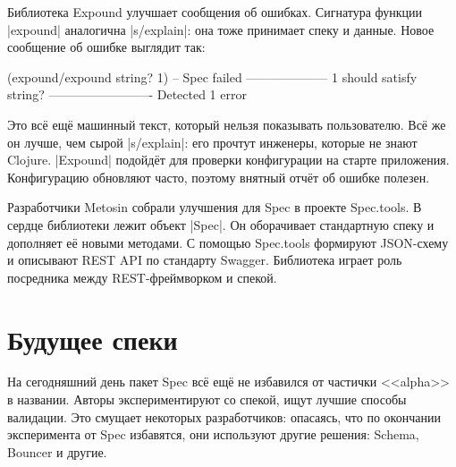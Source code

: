 
Библиотека Expound улучшает сообщения об
ошибках. Сигнатура функции \spverb|expound| аналогична \spverb|s/explain|: она
тоже принимает спеку и данные. Новое сообщение об ошибке выглядит так:


\begin{english}
  \begin{clojure}
(expound/expound string? 1)
-- Spec failed --------------------
  1
should satisfy
  string?
-------------------------
Detected 1 error
  \end{clojure}
\end{english}


Это вс\"{е} ещ\"{е} машинный текст, который нельзя показывать пользователю. Вс\"{е} же
он лучше, чем сырой \spverb|s/explain|: его прочтут инженеры, которые не знают
Clojure. \spverb|Expound| подойд\"{е}т для проверки конфигурации на старте
приложения. Конфигурацию обновляют часто, поэтому внятный отч\"{е}т об ошибке
полезен.


Разработчики Metosin собрали улучшения для Spec в проекте
Spec.tools. В сердце библиотеки
лежит объект \spverb|Spec|. Он оборачивает стандартную спеку и дополняет е\"{е}
новыми методами. С помощью Spec.tools формируют JSON-схему и описывают REST
API по стандарту Swagger. Библиотека играет роль посредника между
REST-фреймворком и спекой.

\section{Будущее спеки}


На сегодняшний день пакет Spec вс\"{е} ещ\"{е} не избавился от частички
<<alpha>> в названии. Авторы экспериментируют со спекой, ищут лучшие способы
валидации. Это смущает некоторых разработчиков: опасаясь, что по окончании
эксперимента от Spec избавятся, они используют другие решения:
Schema,
Bouncer и другие.

